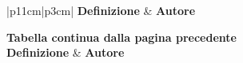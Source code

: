 \begin{longtable}{|p{11cm}|p{3cm}|}
    \hline
    \textbf{Definizione} & \textbf{Autore} \\
    \hline
    \endfirsthead

    {{\bfseries Tabella \thetable{} continua dalla pagina precedente}} \\
    \hline
    \textbf{Definizione} & \textbf{Autore} \\
    \hline
    \endhead

    \hline {} \\ \hline
    \endfoot

    \hline
    \endlastfoot


\end{longtable}
